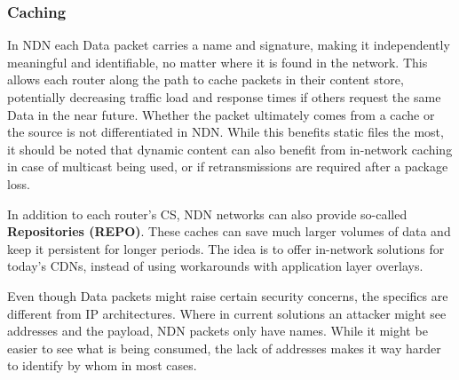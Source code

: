 \subsubsection{Caching}

In NDN each Data packet carries a name and signature, making it independently meaningful and identifiable, no matter where it is found in the network. This allows each router along the path to cache packets in their content store, potentially decreasing traffic load and response times if others request the same Data in the near future. Whether the packet ultimately comes from a cache or the source is not differentiated in NDN. While this benefits static files the most, it should be noted that dynamic content can also benefit from in-network caching in case of multicast being used, or if retransmissions are required after a package loss. 

In addition to each router's CS, NDN networks can also provide so-called \textbf{Repositories (REPO)}. These caches can save much larger volumes of data and keep it persistent for longer periods. The idea is to offer in-network solutions for today's CDNs, instead of using workarounds with application layer overlays.

Even though Data packets might raise certain security concerns, the specifics are different from IP architectures. Where in current solutions an attacker might see addresses and the payload, NDN packets only have names. While it might be easier to see what is being consumed, the lack of addresses makes it way harder to identify by whom in most cases. \cite{ZABJ14}

